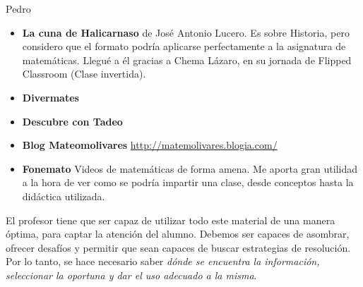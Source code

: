 \begin{opin}{\pedrocolor}{Pedro}
\begin{itemize}
\item \textbf{La cuna de Halicarnaso} de José Antonio Lucero. Es sobre Historia, pero considero que el formato podría aplicarse perfectamente a la asignatura de matemáticas. Llegué a él gracias a Chema Lázaro, en su jornada de Flipped Classroom (Clase invertida). 
\item \textbf{Divermates }
\item \textbf{Descubre con Tadeo }
\item \textbf{Blog Mateomolivares} \url{http://matemolivares.blogia.com/}
\item \textbf{Fonemato} Videos de matemáticas de forma amena. Me aporta gran utilidad a la hora de ver como se podría impartir una clase, desde conceptos hasta la didáctica utilizada. 
\end{itemize} 
 
El profesor tiene que ser capaz de utilizar todo este material de una manera óptima, para captar la atención del alumno. Debemos ser capaces de asombrar, ofrecer desafíos y permitir que sean capaces de buscar estrategias de resolución. Por lo tanto, se hace necesario  saber \textit{dónde se encuentra la información, seleccionar la oportuna y dar el uso adecuado a la misma}.


\end{opin}

